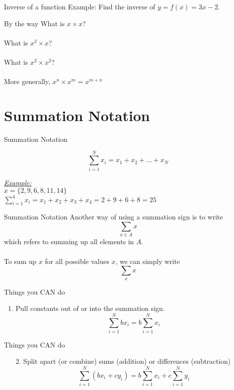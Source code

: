 \documentclass{./../../Latex/teaching_slides}
\begin{document}
\begin{frame}{Inverse of a function}
Example: Find the inverse of $y = f(x) = 3x-2$. 
\end{frame}

\begin{frame}{By the way}
What is $x \times x$? \\~\\
What is $x^2 \times x$? \\~\\
What is $x^2 \times x^2$? \\~\\
More generally, $x^n \times x^m = x^{m+n}$
\end{frame}

\section{Summation Notation}

\begin{frame}[t]{Summation Notation}

$$ \sum_{i=1}^N x_i = x_1 + x_2 + ... + x_N $$

\vspace{1em}
\underline{\textit{Example:}} \\
\vspace{0.5em}
$x = \{2,9,6,8,11,14\}$ \\
\vspace{1em}
$\sum_{i=1}^{4} x_i = x_1 + x_2 + x_3 + x_4 = 2+9+6+8=25$ 
\end{frame}

\begin{frame}{Summation Notation}
Another way of using a summation sign is to write $$\sum_{x \in A} x $$
which refers to summing up all elements in $A$. \\~\\
To sum up $x$ for all possible values $x$, we can simply write $$\sum_x x$$
\end{frame}


\begin{frame}{Things you CAN do}
\begin{enumerate}
\item Pull constants out of or into the summation sign.
$$ \sum_{i=1}^N b x_i = b \sum_{i=1}^N x_i  $$
\end{enumerate}
\end{frame}

\begin{frame}{Things you CAN do}
\begin{enumerate}
\item[2.] Split apart (or combine) sums (addition) or differences (subtraction)
$$ \sum_{i=1}^N (b x_i + c y_i) = b \sum_{i=1}^N x_i  + c \sum_{i=1}^N y_i $$
\end{enumerate}
\end{frame}
\end{document}
